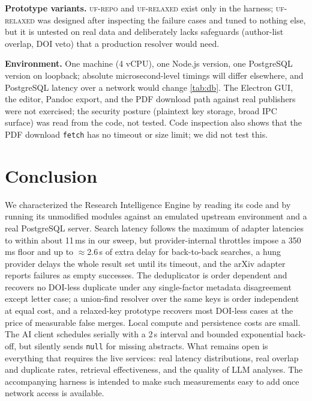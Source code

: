 \documentclass[conference]{IEEEtran}
\newcommand{\code}[1]{\texttt{\small #1}}
\begin{document}
\textbf{Prototype variants.} \textsc{uf-repo} and \textsc{uf-relaxed} exist only in the harness; \textsc{uf-relaxed} was designed after inspecting the failure cases and tuned to nothing else, but it is untested on real data and deliberately lacks safeguards (author-list overlap, DOI veto) that a production resolver would need.

\textbf{Environment.} One machine (4 vCPU), one Node.js version, one PostgreSQL version on loopback; absolute microsecond-level timings will differ elsewhere, and PostgreSQL latency over a network would change \cref{tab:db}. The Electron GUI, the editor, Pandoc export, and the PDF download path against real publishers were not exercised; the security posture (plaintext key storage, broad IPC surface) was read from the code, not tested. Code inspection also shows that the PDF download \code{fetch} has no timeout or size limit; we did not test this.

\section{Conclusion}
\label{sec:concl}

We characterized the Research Intelligence Engine by reading its code and by running its unmodified modules against an emulated upstream environment and a real PostgreSQL server. Search latency follows the maximum of adapter latencies to within about 11\,ms in our sweep, but provider-internal throttles impose a 350\,ms floor and up to $\approx$2.6\,s of extra delay for back-to-back searches, a hung provider delays the whole result set until its timeout, and the arXiv adapter reports failures as empty successes. The deduplicator is order dependent and recovers no DOI-less duplicate under any single-factor metadata disagreement except letter case; a union-find resolver over the same keys is order independent at equal cost, and a relaxed-key prototype recovers most DOI-less cases at the price of measurable false merges. Local compute and persistence costs are small. The AI client schedules serially with a 2\,s interval and bounded exponential back-off, but silently sends \code{null} for missing abstracts. What remains open is everything that requires the live services: real latency distributions, real overlap and duplicate rates, retrieval effectiveness, and the quality of LLM analyses. The accompanying harness is intended to make such measurements easy to add once network access is available.
\end{document}
